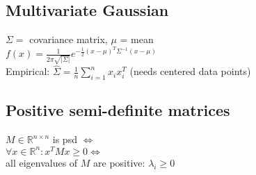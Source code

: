 \documentclass[11pt]{article}
\begin{document}
\begin{multicols*}{3}
	\subsection*{Multivariate Gaussian}
	$\Sigma =$ covariance matrix, $\mu$ = mean\\
	$f(x) = \frac{1}{2\pi \sqrt{|\Sigma|}} e^{- \frac{1}{2} (x-\mu)^T \Sigma^{-1} (x-\mu)}$\\
	Empirical: $\hat{\Sigma} = \frac{1}{n}\sum_{i=1}^n x_i x_i^T$ (needs centered data points)
	
	\subsection*{Positive semi-definite matrices}
	$M \in \mathbb{R}^{n\times n}$ is psd $\Leftrightarrow$\\
	$\forall x \in \mathbb{R}^n: x^TMx \geq 0 \Leftrightarrow$\\
	all eigenvalues of $M$ are positive: $\lambda_i\geq 0$
	
		
	\end{multicols*}
	
\end{document}

